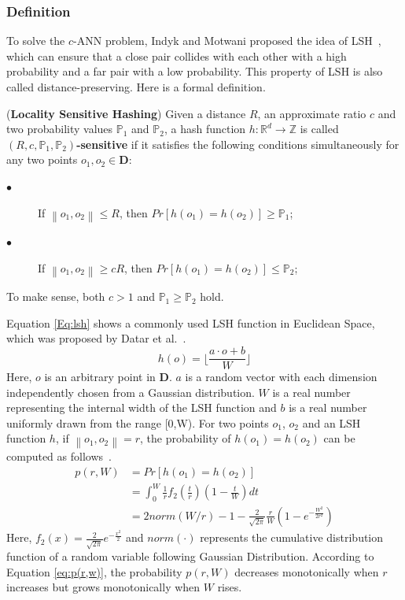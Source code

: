 \documentclass[twocolumn]{svjour3}          %
\begin{document}
\subsubsection{Definition}
To solve the $c$-ANN problem, Indyk and Motwani proposed the idea of LSH~\cite{Indyk1998LSH}, which can ensure that a close pair collides with each other with a high probability and a far pair with a low probability. This property of LSH is also called distance-preserving. Here is a formal definition.
\begin{definition}
\label{def:LSH}
(\textbf{Locality Sensitive Hashing}) Given a distance $R$, an approximate ratio $c$ and two probability values $\mathbb{P}_1$ and $\mathbb{P}_2$, a hash function $h: \mathbb{R}^d \to \mathbb{Z}$ is called \textbf{$(R,c,\mathbb{P}_1,\mathbb{P}_2)$-sensitive} if it satisfies the following conditions simultaneously for any two points $o_1,o_2 \in \textbf{D}$:
\begin{description}
\item[$\bullet$] If $\left\|{o_1,o_2}\right\| \leq R$, then $Pr[h(o_1)=h(o_2)] \geq \mathbb{P}_1$;

\item[$\bullet$] If $\left\|{o_1,o_2}\right\| \geq cR$, then $Pr[h(o_1)=h(o_2)] \leq \mathbb{P}_2$;
\end{description}
To make sense, both $c > 1$ and $\mathbb{P}_1 \geq \mathbb{P}_2$ hold.
\end{definition}

Equation \ref{Eq:lsh} shows a commonly used LSH function in Euclidean Space, which was proposed by Datar et al.~\cite{Datar2004}.
\begin{equation}
h(o) = \lfloor \frac{a \cdot o + b}{W} \rfloor
\label{Eq:lsh}
\end{equation}
Here, $o$ is an arbitrary point in $\textbf{D}$. $a$ is a random vector with each dimension independently chosen from a Gaussian distribution. $W$ is a real number representing the internal width of the LSH function and $b$ is a real number uniformly drawn from the range [0,W). For two points $o_1$, $o_2$ and an LSH function $h$, if $\left\|{o_1 , o_2}\right\| = r$, the probability of $h(o_1)=h(o_2)$ can be computed as follows~\cite{Datar2004}.
\begin{equation}
\label{eq:p(r,w)}
\begin{array}{ll}
p(r,W) &= Pr[h(o_1)=h(o_2)] \\
       &= \int_0^W \frac{1}{r}f_2(\frac{t}{r})(1-\frac{t}{W})dt \\
       &= 2norm(W/r) - 1 - \frac{2}{\sqrt{2\pi}}\frac{r}{W}(1-e^{-\frac{W^2}{2r^2}})
\end{array}
\end{equation}
Here, $f_2(x)=\frac{2}{\sqrt{2\pi}}e^{-\frac{x^2}{2}}$ and $norm(\cdot)$ represents the cumulative distribution function of a random variable following Gaussian Distribution. According to Equation \ref{eq:p(r,w)}, the probability $p(r,W)$ decreases monotonically when $r$ increases but grows monotonically when $W$ rises.
\end{document}
